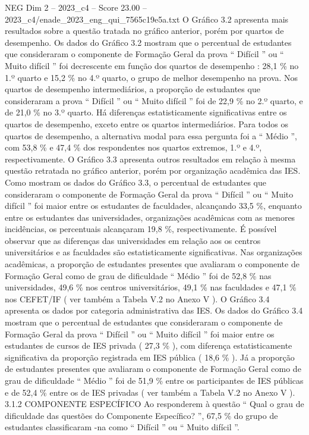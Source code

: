 \begin{textsample}{NEG Dim 2 – 2023\_c4 – Score 23.00 – 2023\_c4/enade\_2023\_eng\_qui\_7565c19e5a.txt}
O Gráfico 3.2 apresenta mais resultados sobre a questão tratada no gráfico anterior, porém por quartos de desempenho.
Os dados do Gráfico 3.2 mostram que o percentual de estudantes que consideraram o componente de Formação Geral da prova “ Difícil ” ou “ Muito difícil ” foi decrescente em função dos quartos de desempenho : 28,1 \% no 1.º quarto e 15,2 \% no 4.º quarto, o grupo de melhor desempenho na prova.
Nos quartos de desempenho intermediários, a proporção de estudantes que consideraram a prova “ Difícil ” ou “ Muito difícil ” foi de 22,9 \% no 2.º quarto, e de 21,0 \% no 3.º quarto.
Há diferenças estatisticamente significativas entre os quartos de desempenho, exceto entre os quartos intermediários.
Para todos os quartos de desempenho, a alternativa modal para essa pergunta foi a “ Médio ”, com 53,8 \% e 47,4 \% dos respondentes nos quartos extremos, 1.º e 4.º, respectivamente.
O Gráfico 3.3 apresenta outros resultados em relação à mesma questão retratada no gráfico anterior, porém por organização acadêmica das IES.
Como mostram os dados do Gráfico 3.3, o percentual de estudantes que consideraram o componente de Formação Geral da prova “ Difícil ” ou “ Muito difícil ” foi maior entre os estudantes de faculdades, alcançando 33,5 \%, enquanto entre os estudantes das universidades, organizações acadêmicas com as menores incidências, os percentuais alcançaram 19,8 \%, respectivamente.
É possível observar que as diferenças das universidades em relação aos os centros universitários e as faculdades são estatisticamente significativas.
Nas organizações acadêmicas, a proporção de estudantes presentes que avaliaram o componente de Formação Geral como de grau de dificuldade “ Médio ” foi de 52,8 \% nas universidades, 49,6 \% nos centros universitários, 49,1 \% nas faculdades e 47,1 \% nos CEFET/IF ( ver também a Tabela V.2 no Anexo V ).
O Gráfico 3.4 apresenta os dados por categoria administrativa das IES.
Os dados do Gráfico 3.4 mostram que o percentual de estudantes que consideraram o componente de Formação Geral da prova “ Difícil ” ou “ Muito difícil ” foi maior entre os estudantes de cursos de IES privada ( 27,3 \% ), com diferença estatisticamente significativa da proporção registrada em IES pública ( 18,6 \% ).
Já a proporção de estudantes presentes que avaliaram o componente de Formação Geral como de grau de dificuldade “ Médio ” foi de 51,9 \% entre os participantes de IES públicas e de 52,4 \% entre os de IES privadas ( ver também a Tabela V.2 no Anexo V ). 3.1.2 COMPONENTE ESPECÍFICO Ao responderem à questão “ Qual o grau de dificuldade das questões do Componente Específico? ”, 67,5 \% do grupo de estudantes classificaram -na como “ Difícil ” ou “ Muito difícil ”.

\end{textsample}
